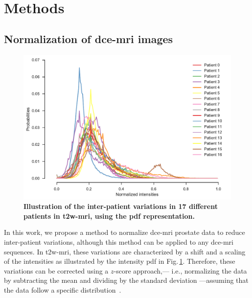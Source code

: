 \section{Methods}\label{sec:method}

\subsection{Normalization of \ac{dce}-\ac{mri} images}\label{sec:norm}

\begin{figure}
  \centering
  \includegraphics[width=0.7\linewidth]{02_methods/figures/t2w.pdf}
  \caption{\textbf{Illustration of the inter-patient variations in 17
    different patients in \acs*{t2w}-\acs*{mri}, using the \acs*{pdf} representation.}}
  \label{fig:t2w}
\end{figure}

In this work, we propose a method to normalize \ac{dce}-\ac{mri}
prostate data to reduce inter-patient variations, although this method can be applied to any \ac{dce}-\ac{mri} sequences.
In \ac{t2w}-\ac{mri}, these variations are characterized by a shift and a scaling of the intensities as illustrated by the intensity \ac{pdf} in Fig.\,\ref{fig:t2w}.
Therefore, these variations can be corrected using a $z$-score approach,--- i.e., normalizing the data by subtracting the mean and dividing by the standard deviation ---assuming that the data follow a specific distribution~\citep{lemaitre2016normalization}.

